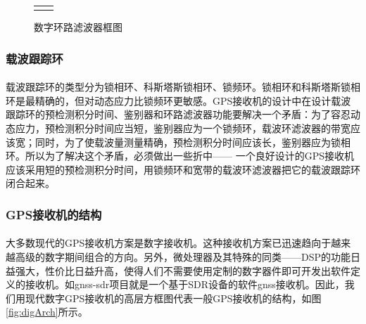 \documentclass[UTF8,titlepage]{ctexart}
\begin{document}
\begin{figure}[H]
\begin{tabular}{cc}
\begin{minipage}{.5\textwidth}
    \caption{数字环路滤波器框图\cite{gpsPrin}}
    \label{fig:disCircle}
    \end{minipage}
  \end{tabular}
\end{figure}
\subsubsection*{载波跟踪环}
\paragraph*{}载波跟踪环的类型分为锁相环、科斯塔斯锁相环、锁频环。锁相环和科斯塔斯锁相环是最精确的，但对动态应力比锁频环更敏感。GPS接收机的设计中在设计载波跟踪环的预检测积分时间、鉴别器和环路滤波器功能要解决一个矛盾：为了容忍动态应力，预检测积分时间应当短，鉴别器应为一个锁频环，载波环滤波器的带宽应该宽；同时，为了使载波量测量精确，预检测积分时间应该长，鉴别器应为锁相环。所以为了解决这个矛盾，必须做出一些折中—— 一个良好设计的GPS接收机应该采用短的预检测积分时间，用锁频环和宽带的载波环滤波器把它的载波跟踪环闭合起来。
\subsubsection*{GPS接收机的结构}
\paragraph*{}大多数现代的GPS接收机方案是数字接收机。这种接收机方案已迅速趋向于越来越高级的数字期间组合的方向。另外，微处理器及其特殊的同类——DSP的功能日益强大，性价比日益升高，使得人们不需要使用定制的数字器件即可开发出软件定义的接收机。如gnss-sdr项目\cite{gnssSdr}就是一个基于SDR设备的软件gnss接收机。因此，我们用现代数字GPS接收机的高层方框图代表一般GPS接收机的结构，如图\ref{fig:digArch}所示。
\end{document}
